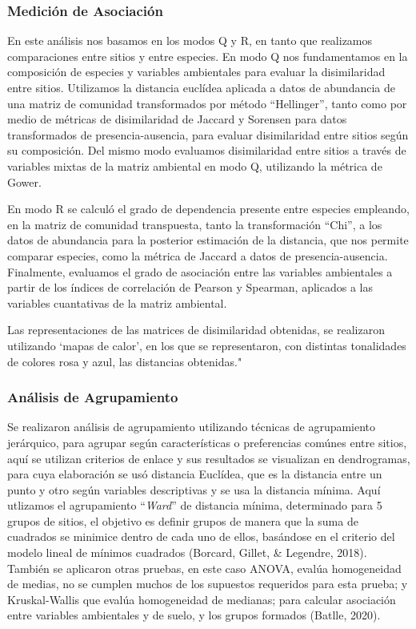 \documentclass[11pt,]{article}
\begin{document}
\subsubsection{Medición de
Asociación}\label{mediciuxf3n-de-asociaciuxf3n}

En este análisis nos basamos en los modos Q y R, en tanto que realizamos
comparaciones entre sitios y entre especies. En modo Q nos fundamentamos
en la composición de especies y variables ambientales para evaluar la
disimilaridad entre sitios. Utilizamos la distancia euclídea aplicada a
datos de abundancia de una matriz de comunidad transformados por método
``Hellinger'', tanto como por medio de métricas de disimilaridad de
Jaccard y Sorensen para datos transformados de presencia-ausencia, para
evaluar disimilaridad entre sitios según su composición. Del mismo modo
evaluamos disimilaridad entre sitios a través de variables mixtas de la
matriz ambiental en modo Q, utilizando la métrica de Gower.

En modo R se calculó el grado de dependencia presente entre especies
empleando, en la matriz de comunidad transpuesta, tanto la
transformación ``Chi'', a los datos de abundancia para la posterior
estimación de la distancia, que nos permite comparar especies, como la
métrica de Jaccard a datos de presencia-ausencia. Finalmente, evaluamos
el grado de asociación entre las variables ambientales a partir de los
índices de correlación de Pearson y Spearman, aplicados a las variables
cuantativas de la matriz ambiental.

Las representaciones de las matrices de disimilaridad obtenidas, se
realizaron utilizando `mapas de calor', en los que se representaron, con
distintas tonalidades de colores rosa y azul, las distancias obtenidas."

\subsubsection{Análisis de
Agrupamiento}\label{anuxe1lisis-de-agrupamiento}

Se realizaron análisis de agrupamiento utilizando técnicas de
agrupamiento jerárquico, para agrupar según características o
preferencias comúnes entre sitios, aquí se utilizan criterios de enlace
y sus resultados se visualizan en dendrogramas, para cuya elaboración se
usó distancia Euclídea, que es la distancia entre un punto y otro según
variables descriptivas y se usa la distancia mínima. Aquí utlizamos el
agrupamiento ``\emph{Ward}'' de distancia mínima, determinado para 5
grupos de sitios, el objetivo es definir grupos de manera que la suma de
cuadrados se minimice dentro de cada uno de ellos, basándose en el
criterio del modelo lineal de mínimos cuadrados (Borcard, Gillet, \&
Legendre, 2018). También se aplicaron otras pruebas, en este caso ANOVA,
evalúa homogeneidad de medias, no se cumplen muchos de los supuestos
requeridos para esta prueba; y Kruskal-Wallis que evalúa homogeneidad de
medianas; para calcular asociación entre variables ambientales y de
suelo, y los grupos formados (Batlle, 2020).
\end{document}
